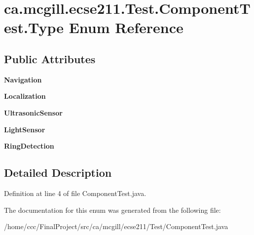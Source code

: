 \hypertarget{enumca_1_1mcgill_1_1ecse211_1_1_test_1_1_component_test_1_1_type}{}\section{ca.\+mcgill.\+ecse211.\+Test.\+Component\+Test.\+Type Enum Reference}
\label{enumca_1_1mcgill_1_1ecse211_1_1_test_1_1_component_test_1_1_type}
\subsection*{Public Attributes}
\begin{DoxyCompactItemize}
\item 
\mbox{\label{enumca_1_1mcgill_1_1ecse211_1_1_test_1_1_component_test_1_1_type_aac4850e93fc1ea53074453cff575ae95}} 
{\bfseries Navigation}
\item 
\mbox{\label{enumca_1_1mcgill_1_1ecse211_1_1_test_1_1_component_test_1_1_type_a3ad7ba64875754fe3d917f97e90dead5}} 
{\bfseries Localization}
\item 
\mbox{\label{enumca_1_1mcgill_1_1ecse211_1_1_test_1_1_component_test_1_1_type_af74146bde7c196280d16403e626f2040}} 
{\bfseries Ultrasonic\+Sensor}
\item 
\mbox{\label{enumca_1_1mcgill_1_1ecse211_1_1_test_1_1_component_test_1_1_type_a42514ef7752b2a7cc3d752aad823d42d}} 
{\bfseries Light\+Sensor}
\item 
\mbox{\label{enumca_1_1mcgill_1_1ecse211_1_1_test_1_1_component_test_1_1_type_a8e8354209d30f5612551aa9b95104dcd}} 
{\bfseries Ring\+Detection}
\end{DoxyCompactItemize}


\subsection{Detailed Description}


Definition at line 4 of file Component\+Test.\+java.



The documentation for this enum was generated from the following file\+:\begin{DoxyCompactItemize}
\item 
/home/ccc/\+Final\+Project/src/ca/mcgill/ecse211/\+Test/Component\+Test.\+java\end{DoxyCompactItemize}
